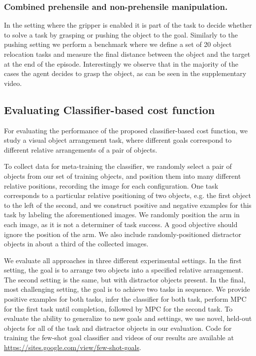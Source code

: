 \subsubsection{Combined prehensile and non-prehensile manipulation.}


In the setting where the gripper is enabled it is part of the task to decide whether to solve a task by grasping or pushing the object to the goal. Similarly to the pushing setting we perform a benchmark where we define a set of 20 object relocation tasks and measure the final distance between the object and the target at the end of the episode. Interestingly we observe that in the majority of the cases the agent decides to grasp the object, as can be seen in the supplementary video.

\subsection{Evaluating Classifier-based cost function}

For evaluating the performance of the proposed classifier-based cost function, we study a visual object arrangement task, where different goals correspond to different relative arrangements of a pair of objects. 


To collect data for meta-training the classifier, we randomly select a pair of objects from our set of training objects, and position them into many different relative positions, recording the image for each configuration. One task corresponds to a particular relative positioning of two objects, e.g. the first object to the left of the second, and we construct positive and negative examples for this task by labeling the aforementioned images. We randomly position the arm in each image, as it is not a determiner of task success. A good objective should ignore the position of the arm. We also include randomly-positioned distractor objects in about a third of the collected images.

We evaluate all approaches in three different experimental settings. In the first setting, the goal is to arrange two objects into a specified relative arrangement. The second setting is the same, but with distractor objects present. In the final, most challenging setting, the goal is to achieve two tasks in sequence. We provide positive examples for both tasks, infer the classifier for both task, perform MPC for the first task until completion, followed by MPC for the second task. To evaluate the ability to generalize to new goals and settings, we use novel, held-out objects for all of the task and distractor objects in our evaluation. Code for training the few-shot goal classifier and videos of our results are available at \url{https://sites.google.com/view/few-shot-goals}.

